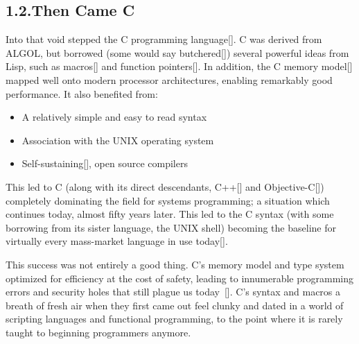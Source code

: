 \documentclass[preprint]{{acmart}}
\begin{document}
\subsection{1.2.\hspace*{0.5em}Then Came C}\label{sec-then-came-c}%

\noindent{}Into that void stepped the C programming language[]. C was derived
from ALGOL, but borrowed (some would say butchered[]) several
powerful ideas from Lisp, such as macros[] and function
pointers[]. In addition, the C memory model[] mapped well onto
modern processor architectures, enabling remarkably good performance. It
also benefited from:%

\begin{itemize}[noitemsep,topsep=\mdcompacttopsep]%

\item{}A relatively simple and easy to read syntax%

\item{}Association with the UNIX operating system%

\item{}Self-sustaining[], open source compilers%
\end{itemize}%

\noindent{}This led to C (along with its direct descendants, C++[] and
Objective-C[]) completely dominating the field for systems
programming; a situation which continues today, almost fifty years later.
This led to the C syntax (with some borrowing from its sister language,
the UNIX shell) becoming the baseline for virtually every mass-market
language in use today[].%

This success was not entirely a good thing. C's memory model and type
system optimized for efficiency at the cost of safety, leading to
innumerable programming errors and security holes that still plague us
today~{}[]. C's syntax and macros \textendash{}  a breath of fresh air
when they first came out \textendash{} feel clunky and dated in a world of scripting
languages and functional programming, to the point where it is rarely
taught to beginning programmers anymore.%
\end{document}
